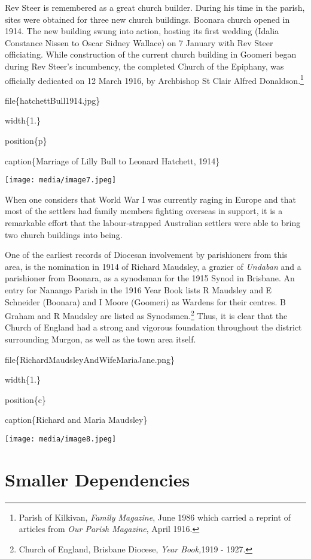 Rev Steer is remembered as a great church builder. During his time in the parish, sites were obtained for three new church buildings. Boonara church opened in 1914. The new building swung into action, hosting its first wedding (Idalia Constance Nissen to Oscar Sidney Wallace) on 7 January with Rev Steer officiating. While construction of the current church building in Goomeri began during Rev Steer's incumbency, the completed Church of the Epiphany, was officially dedicated on 12 March 1916, by Archbishop St Clair Alfred Donaldson.\footnote{Parish of Kilkivan, \emph{Family Magazine}, June 1986 which carried a reprint of articles from \emph{Our Parish Magazine}, April 1916.}

file\{hatchettBull1914.jpg\}

width\{1.\}

position\{p\}

caption\{Marriage of Lilly Bull to Leonard Hatchett, 1914\}

\texttt{[image: media/image7.jpeg]}

When one considers that World War I was currently raging in Europe and that most of the settlers had family members fighting overseas in support, it is a remarkable effort that the labour-strapped Australian settlers were able to bring two church buildings into being.

One of the earliest records of Diocesan involvement by parishioners from this area, is the nomination in 1914 of Richard Maudsley, a grazier of \emph{Undaban} and a parishioner from Boonara, as a synodsman for the 1915 Synod in Brisbane. An entry for Nanango Parish in the 1916 Year Book lists R Maudsley and E Schneider (Boonara) and I Moore (Goomeri) as Wardens for their centres. B Graham and R Maudsley are listed as Synodsmen.\footnote{Church of England, Brisbane Diocese, \emph{Year Book,}1919 - 1927.} Thus, it is clear that the Church of England had a strong and vigorous foundation throughout the district surrounding Murgon, as well as the town area itself.

file\{RichardMaudsleyAndWifeMariaJane.png\}

width\{1.\}

position\{c\}

caption\{Richard and Maria Maudsley\}

\texttt{[image: media/image8.jpeg]}

\hypertarget{smaller-dependencies}{%
\section{Smaller Dependencies}\label{smaller-dependencies}}

